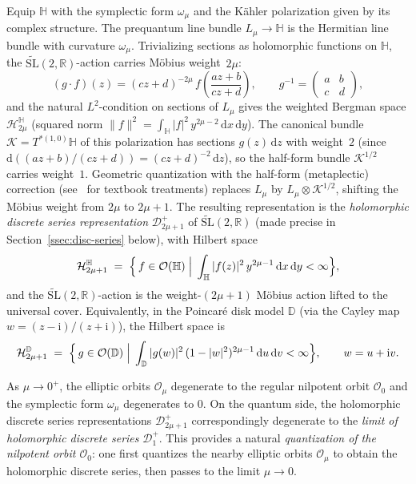 \documentclass[11pt]{article}
\theoremstyle{plain}
\theoremstyle{definition}
\theoremstyle{remark}
\newcommand{\R}{\mathbb{R}}
\newcommand{\HH}{\mathbb{H}}
\newcommand{\SLt}{\widetilde{\mathrm{SL}}}
\newcommand{\OO}{\mathcal{O}}
\newcommand{\D}{\mathcal{D}}
\newcommand{\DD}{\mathbb{D}}
\newcommand{\Hil}{\mathcal{H}}
\newcommand{\ii}{\mathrm{i}}
\begin{document}
Equip $\HH$ with the symplectic form $\omega_{\mu}$
and the K\"ahler polarization given by its complex structure.
The prequantum line bundle $L_{\mu}\to\HH$ is the Hermitian line bundle
with curvature $\omega_{\mu}$. Trivializing sections as holomorphic functions
on $\HH$, the $\SLt(2,\R)$-action carries M\"obius weight~$2\mu$:
\[
  (g\cdot f)(z)
  =(cz+d)^{-2\mu}\,f\!\left(\frac{az+b}{cz+d}\right),\qquad
  g^{-1}=\begin{pmatrix}a&b\\c&d\end{pmatrix},
\]
and the natural $L^{2}$-condition on sections of $L_{\mu}$ gives the
weighted Bergman space $\Hil^{\HH}_{2\mu}$
(squared norm $\|f\|^{2}=\int_{\HH}|f|^{2}\,y^{2\mu-2}\,\mathrm{d}x\,\mathrm{d}y$).
The canonical bundle $\mathcal{K}=T^{*(1,0)}\HH$ of this polarization has sections $g(z)\,\mathrm{d}z$
with weight~$2$ (since $\mathrm{d}((az+b)/(cz+d))
=(cz+d)^{-2}\,\mathrm{d}z$), so the half-form bundle $\mathcal{K}^{1/2}$
carries weight~$1$.
Geometric quantization with the half-form (metaplectic) correction
(see~\cite{Sniatycki1980,Woodhouse1991} for textbook
treatments) replaces $L_{\mu}$ by $L_{\mu}\otimes \mathcal{K}^{1/2}$, shifting
the M\"obius weight from $2\mu$ to $2\mu+1$. The resulting representation is the
\emph{holomorphic discrete series representation}
$\D_{2\mu+1}^{+}$ of $\SLt(2,\R)$ (made precise in Section~\ref{ssec:disc-series}
below), with Hilbert space
\[
  \Hil^{\HH}_{2\mu+1}\;=\;\Bigl\{\,f\in\mathcal{O}(\HH)\;\Big|\;
  \int_{\HH}|f(z)|^{2}\,y^{2\mu-1}\,\mathrm{d}x\,\mathrm{d}y<\infty\Bigr\},
\]
and the $\SLt(2,\R)$-action is the weight-$(2\mu+1)$ M\"obius action lifted to
the universal cover.
Equivalently, in the Poincar\'e disk model $\DD$ (via the Cayley map
$w=(z-\ii)/(z+\ii)$), the Hilbert space is
\[
  \Hil^{\DD}_{2\mu+1}\;=\;\Bigl\{\,g\in\mathcal{O}(\DD)\;\Big|\;
  \int_{\DD}|g(w)|^{2}\,(1-|w|^{2})^{2\mu-1}\,\mathrm{d}u\,\mathrm{d}v<\infty\Bigr\},
  \qquad w=u+\ii v.
\]

As $\mu\to 0^{+}$, the elliptic orbits $\OO_{\mu}$ degenerate to the regular nilpotent orbit $\OO_{0}$ and the symplectic form
$\omega_{\mu}$ degenerates to $0$. On the quantum side, the holomorphic discrete series
representations $\D_{2\mu+1}^{+}$ correspondingly degenerate to the
\emph{limit of holomorphic discrete series} $\D_{1}^{+}$. This provides a natural
\emph{quantization of the nilpotent orbit $\OO_{0}$}: one first quantizes the nearby elliptic orbits $\OO_{\mu}$
to obtain the holomorphic discrete series, then passes to the limit $\mu\to 0$.
\end{document}
